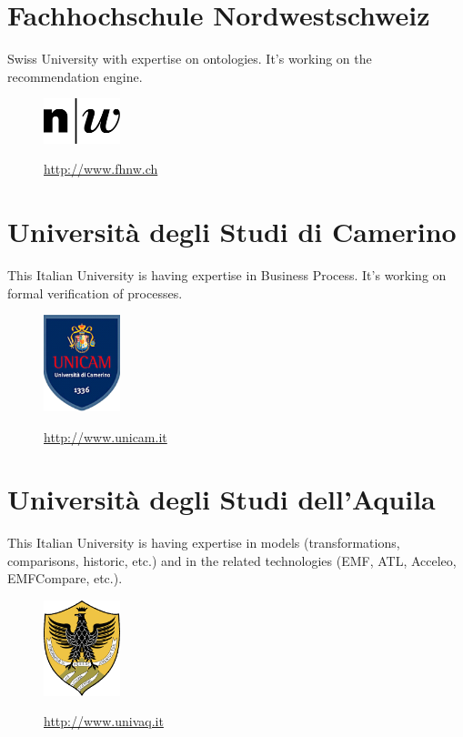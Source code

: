 \documentclass{learnpad}
\begin{document}
\section{Fachhochschule Nordwestschweiz}
Swiss University with expertise on ontologies.  It's working on the
recommendation engine.

\begin{figure}[!htp]
	\centering
	\includegraphics[width=6em,keepaspectratio]{figures/fhnw.jpg}\par
	\url{http://www.fhnw.ch}
\end{figure}

\section{Università degli Studi di Camerino}
This Italian University is having expertise in Business Process.  It's working
on formal verification of processes.

\begin{figure}[!htp]
	\centering
	\includegraphics[width=6em,keepaspectratio]{figures/unicam.png}\par
	\url{http://www.unicam.it}
\end{figure}

\section{Università degli Studi dell'Aquila}
This Italian University is having expertise in models (transformations,
comparisons, historic, etc.) and in the related technologies (EMF, ATL, Acceleo,
EMFCompare, etc.).

\begin{figure}[!htp]
	\centering
	\includegraphics[width=6em,keepaspectratio]{figures/univaq.png}\par
	\url{http://www.univaq.it}
\end{figure}
\end{document}
